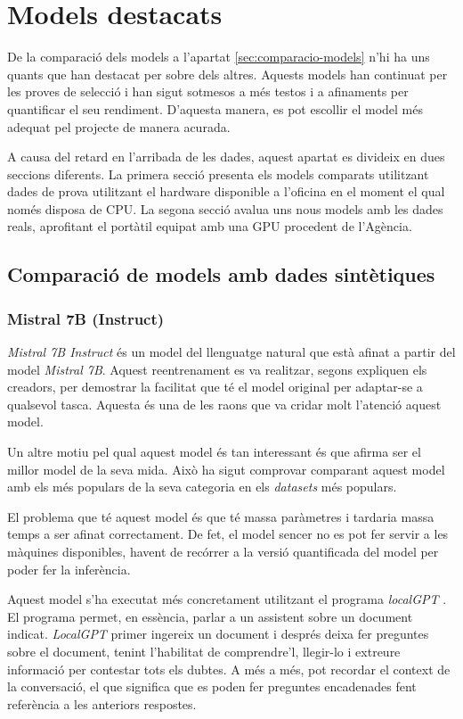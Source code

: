 \section{Models destacats}
De la comparació dels models a l'apartat \ref{sec:comparacio-models} n'hi ha uns quants que han destacat per sobre dels altres. Aquests models han continuat per les proves de selecció i han sigut sotmesos a més testos i a afinaments per quantificar el seu rendiment. D'aquesta manera, es pot escollir el model més adequat pel projecte de manera acurada.

A causa del retard en l'arribada de les dades, aquest apartat es divideix en dues seccions diferents. La primera secció presenta els models comparats utilitzant dades de prova utilitzant el hardware disponible a l'oficina en el moment el qual només disposa de CPU. La segona secció avalua uns nous models amb les dades reals, aprofitant el portàtil equipat amb una GPU procedent de l'Agència.

\subsection{Comparació de models amb dades sintètiques}
\subsubsection{Mistral 7B (Instruct)}
\textit{Mistral 7B Instruct} \cite{mistral} és un model del llenguatge natural que està afinat a partir del model \textit{Mistral 7B}. Aquest reentrenament es va realitzar, segons expliquen els creadors, per demostrar la facilitat que té el model original per adaptar-se a qualsevol tasca. Aquesta és una de les raons que va cridar molt l'atenció aquest model.

Un altre motiu pel qual aquest model és tan interessant és que afirma ser el millor model de la seva mida. Això ha sigut comprovar comparant aquest model amb els més populars de la seva categoria en els \textit{datasets} més populars.

El problema que té aquest model és que té massa paràmetres i tardaria massa temps a ser afinat correctament. De fet, el model sencer no es pot fer servir a les màquines disponibles, havent de recórrer a la versió quantificada del model per poder fer la inferència. 

Aquest model s'ha executat més concretament utilitzant el programa \textit{localGPT} \cite{localgpt}. El programa permet, en essència, parlar a un assistent sobre un document indicat. \textit{LocalGPT} primer ingereix un document i després deixa fer preguntes sobre el document, tenint l'habilitat de comprendre'l, llegir-lo i extreure informació per contestar tots els dubtes. A més a més, pot recordar el context de la conversació, el que significa que es poden fer preguntes encadenades fent referència a les anteriors respostes.

